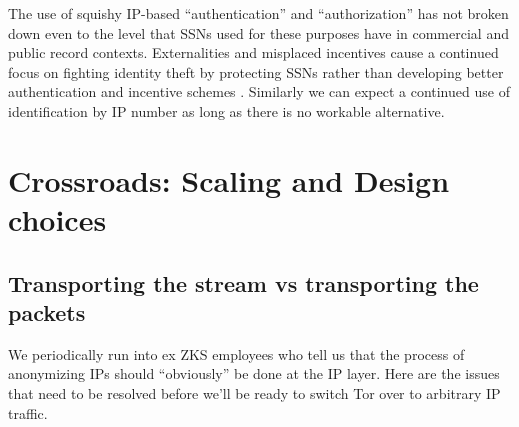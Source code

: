\documentclass{llncs}
\begin{document}
The use of squishy IP-based ``authentication'' and ``authorization''
has not broken down even to the level that SSNs used for these
purposes have in commercial and public record contexts. Externalities
and misplaced incentives cause a continued focus on fighting identity
theft by protecting SSNs rather than developing better authentication
and incentive schemes \cite{price-privacy}. Similarly we can expect a
continued use of identification by IP number as long as there is no
workable alternative.


\section{Crossroads: Scaling and Design choices}
\label{sec:crossroads-design}

\subsection{Transporting the stream vs transporting the packets}
\label{subsec:stream-vs-packet}
\label{subsec:tcp-vs-ip}

We periodically run into ex ZKS employees who tell us that the process of
anonymizing IPs should ``obviously'' be done at the IP layer. Here are
the issues that need to be resolved before we'll be ready to switch Tor
over to arbitrary IP traffic.
\end{document}
